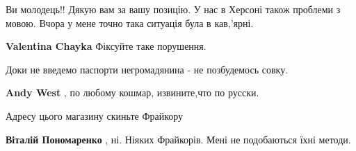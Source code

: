 \begin{itemize}
Ви молодець!! Дякую вам за вашу позицію. У нас в Херсоні також проблеми з мовою. Вчора у мене точно така ситуація була в кав,'ярні.

\begin{itemize}
 
\textbf{Valentina Chayka} Фіксуйте таке порушення.
\end{itemize}

 
Доки не введемо паспорти негромадянина - не позбудемось совку.

\begin{itemize}
 
\textbf{Andy West} , по любому кошмар, извините,что по русски.
\end{itemize}

 
Адресу цього магазину скиньте Фрайкору

\begin{itemize}
 
\textbf{Віталій Пономаренко} , ні. Ніяких Фрайкорів. Мені не подобаються їхні методи.

 

\end{itemize}
\end{itemize}
